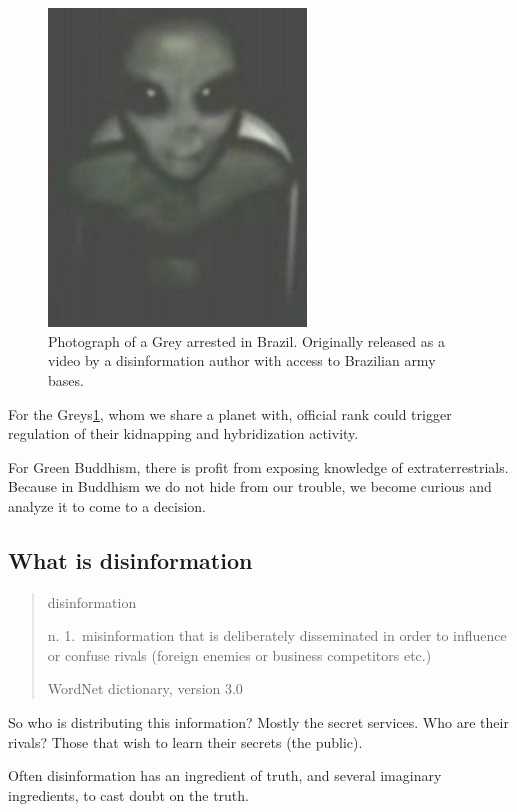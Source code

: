 \documentclass{report}
\begin{document}
\begin{figure}
  \centering
  \includegraphics[width=0.61\textwidth]{photograph/gray-alien-upper-body.jpg}
  \caption{Photograph of a Grey arrested in Brazil. Originally released as a video by a
disinformation author with access to Brazilian army bases.}
\label{fig:grey}
\end{figure}

For the Greys\ref{fig:grey}, whom we share a planet with, official rank could trigger
regulation of their kidnapping and hybridization activity. 

For Green Buddhism, there is profit from exposing knowledge of
extraterrestrials. Because in Buddhism we do not hide from our trouble, we
become curious and analyze it to come to a decision.

\subsection{What is disinformation}
\label{disinformation}

\blockquote[WordNet dictionary, version 3.0]{disinformation

n. 1.\  misinformation that is deliberately disseminated in order to influence or
confuse rivals (foreign enemies or business competitors etc.)}

So who is distributing this information? Mostly the secret services.
Who are their rivals? Those that wish to learn their secrets (the public).

Often disinformation has an ingredient of truth, and several imaginary
ingredients, to cast doubt on the truth.
\end{document}
